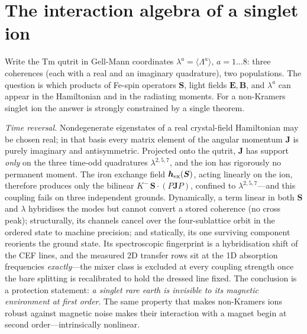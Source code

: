 \documentclass[aps,prb,twocolumn,superscriptaddress,longbibliography]{revtex4-2}
\newcommand{\ve}[1]{\boldsymbol{#1}}
\begin{document}
\section{The interaction algebra of a singlet ion}
\label{sec:principle}

Write the Tm qutrit in Gell-Mann coordinates
$\lambda^a=\langle\Lambda^a\rangle$, $a=1\ldots8$: three coherences
(each with a real and an imaginary quadrature), two populations.  The
question is which products of Fe-spin operators $\ve S$, light fields
$\ve E,\ve B$, and $\lambda^a$ can appear in the Hamiltonian and in
the radiating moments.  For a non-Kramers singlet ion the answer is
strongly constrained by a single theorem.

\emph{Time reversal.}  Nondegenerate eigenstates of a real
crystal-field Hamiltonian may be chosen real; in that basis every
matrix element of the angular momentum $\ve J$ is purely imaginary
and antisymmetric.  Projected onto the qutrit, $\ve J$ has support
\emph{only} on the three time-odd quadratures $\lambda^{2,5,7}$, and
the ion has rigorously no permanent moment.  The iron exchange field
$\ve h_{\rm ex}(\ve S)$, acting linearly on the ion, therefore
produces only the bilinear $K^-\,\ve S\cdot(P\ve JP)$, confined to
$\lambda^{2,5,7}$---and this coupling fails on three independent
grounds.  Dynamically, a term linear in both $\ve S$ and $\lambda$
hybridises the modes but cannot convert a stored coherence (no cross
peak); structurally, its channels cancel over the four-sublattice
orbit in the ordered state to machine precision; and statically, its
one surviving component reorients the ground state.  Its
spectroscopic fingerprint is a hybridisation shift of the CEF lines,
and the measured 2D transfer rows sit at the 1D absorption
frequencies \emph{exactly}---the mixer class is excluded at every
coupling strength once the bare splitting is recalibrated to hold the
dressed line fixed.  The conclusion is a protection statement:
\emph{a singlet rare earth is invisible to its magnetic environment
at first order}.  The same property that makes non-Kramers ions
robust against magnetic noise makes their interaction with a magnet
begin at second order---intrinsically nonlinear.
\end{document}
